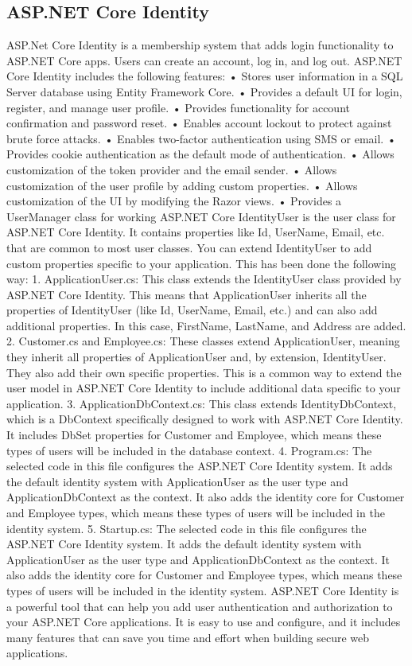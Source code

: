 \subsection{ASP.NET Core Identity}
ASP.Net Core Identity is a membership system that adds login functionality to ASP.NET Core apps. Users can create an account, log in, and log out. ASP.NET Core Identity includes the following features:
•	Stores user information in a SQL Server database using Entity Framework Core.
•	Provides a default UI for login, register, and manage user profile.
•	Provides functionality for account confirmation and password reset.
•	Enables account lockout to protect against brute force attacks.
•	Enables two-factor authentication using SMS or email.
•	Provides cookie authentication as the default mode of authentication.
•	Allows customization of the token provider and the email sender.
•	Allows customization of the user profile by adding custom properties.
•	Allows customization of the UI by modifying the Razor views.
•	Provides a UserManager class for working
ASP.NET Core IdentityUser is the user class for ASP.NET Core Identity. It contains properties like Id, UserName, Email, etc. that are common to most user classes. You can extend IdentityUser to add custom properties specific to your application.
This has been done the following way:
1.	ApplicationUser.cs: This class extends the IdentityUser class provided by ASP.NET Core Identity. This means that ApplicationUser inherits all the properties of IdentityUser (like Id, UserName, Email, etc.) and can also add additional properties. In this case, FirstName, LastName, and Address are added.
2.	Customer.cs and Employee.cs: These classes extend ApplicationUser, meaning they inherit all properties of ApplicationUser and, by extension, IdentityUser. They also add their own specific properties. This is a common way to extend the user model in ASP.NET Core Identity to include additional data specific to your application.
3.	ApplicationDbContext.cs: This class extends IdentityDbContext, which is a DbContext specifically designed to work with ASP.NET Core Identity. It includes DbSet properties for Customer and Employee, which means these types of users will be included in the database context.
4.	Program.cs: The selected code in this file configures the ASP.NET Core Identity system. It adds the default identity system with ApplicationUser as the user type and ApplicationDbContext as the context. It also adds the identity core for Customer and Employee types, which means these types of users will be included in the identity system.
5.	Startup.cs: The selected code in this file configures the ASP.NET Core Identity system. It adds the default identity system with ApplicationUser as the user type and ApplicationDbContext as the context. It also adds the identity core for Customer and Employee types, which means these types of users will be included in the identity system.
ASP.NET Core Identity is a powerful tool that can help you add user authentication and authorization to your ASP.NET Core applications. It is easy to use and configure, and it includes many features that can save you time and effort when building secure web applications.


